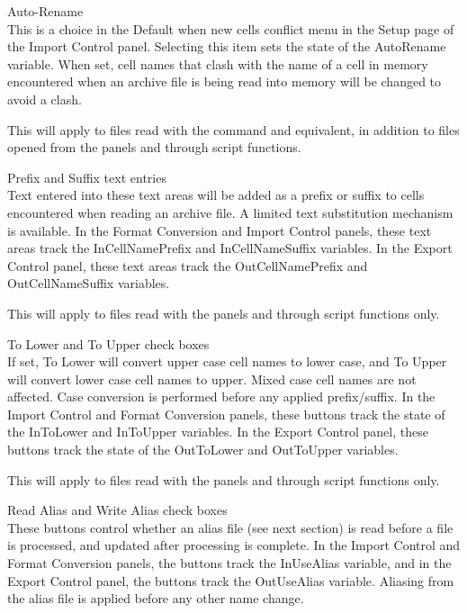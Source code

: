 \begin{description}
\item{{\cb Auto-Rename}}\\
This is a choice in the {\cb Default when new cells conflict} menu in
the {\cb Setup} page of the {\cb Import Control} panel.  Selecting
this item sets the state of the {\et AutoRename} variable.  When set,
cell names that clash with the name of a cell in memory encountered
when an archive file is being read into memory will be changed to
avoid a clash.

This will apply to files read with the {} command and
equivalent, in addition to files opened from the panels and through
script functions.

\item{{\cb Prefix} and {\cb Suffix} text entries}\\
Text entered into these text areas will be added as a prefix or suffix
to cells encountered when reading an archive file.  A limited text
substitution mechanism is available.  In the {\cb Format Conversion}
and {\cb Import Control} panels, these text areas track the {\et
InCellNamePrefix} and {\et InCellNameSuffix} variables.  In the {\cb
Export Control} panel, these text areas track the {\et
OutCellNamePrefix} and {\et OutCellNameSuffix} variables.

This will apply to files read with the panels and through
script functions only.

\item{{\cb To Lower} and {\cb To Upper} check boxes}\\
If set, {\cb To Lower} will convert upper case cell names to lower
case, and {\cb To Upper} will convert lower case cell names to upper. 
Mixed case cell names are not affected.  Case conversion is performed
before any applied prefix/suffix.  In the {\cb Import Control} and
{\cb Format Conversion} panels, these buttons track the state of the
{\et InToLower} and {\et InToUpper} variables.  In the {\cb Export
Control} panel, these buttons track the state of the {\et OutToLower}
and {\et OutToUpper} variables.

This will apply to files read with the panels and through
script functions only.

\item{{\cb Read Alias} and {\cb Write Alias} check boxes}\\
These buttons control whether an alias file (see next section) is read
before a file is processed, and updated after processing is complete. 
In the {\cb Import Control} and {\cb Format Conversion} panels, the
buttons track the {\et InUseAlias} variable, and in the {\cb Export
Control} panel, the buttons track the {\et OutUseAlias} variable. 
Aliasing from the alias file is applied before any other name change.


\end{description}
